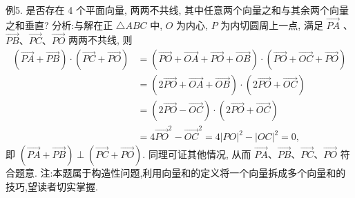 例5. 是否存在 4 个平面向量, 两两不共线, 其中任意两个向量之和与其余两个向量之和垂直?
分析:与解在正 $\triangle A B C$ 中, $O$ 为内心, $P$ 为内切圆周上一点, 满足 $\overrightarrow{P A}$ 、 $\overrightarrow{P B} 、 \overrightarrow{P C} 、 \overrightarrow{P O}$ 两两不共线, 则
$$
\begin{aligned}
(\overrightarrow{P A}+\overrightarrow{P B}) \cdot(\overrightarrow{P C}+\overrightarrow{P O}) & =(\overrightarrow{P O}+\overrightarrow{O A}+\overrightarrow{P O}+\overrightarrow{O B}) \cdot(\overrightarrow{P O}+\overrightarrow{O C}+\overrightarrow{P O}) \\
& =(2 \overrightarrow{P O}+\overrightarrow{O A}+\overrightarrow{O B}) \cdot(2 \overrightarrow{P O}+\overrightarrow{O C}) \\
& =(2 \overrightarrow{P O}-\overrightarrow{O C}) \cdot(2 \overrightarrow{P O}+\overrightarrow{O C}) \\
& =4 \overrightarrow{P O}^2-\overrightarrow{O C}^2=4|P O|^2-|O C|^2=0,
\end{aligned}
$$
即 $(\overrightarrow{P A}+\overrightarrow{P B}) \perp(\overrightarrow{P C}+\overrightarrow{P O})$.
同理可证其他情况, 从而 $\overrightarrow{P A} 、 \overrightarrow{P B} 、 \overrightarrow{P C} 、 \overrightarrow{P O}$ 符合题意.
注:本题属于构造性问题,利用向量和的定义将一个向量拆成多个向量和的技巧,望读者切实掌握.



